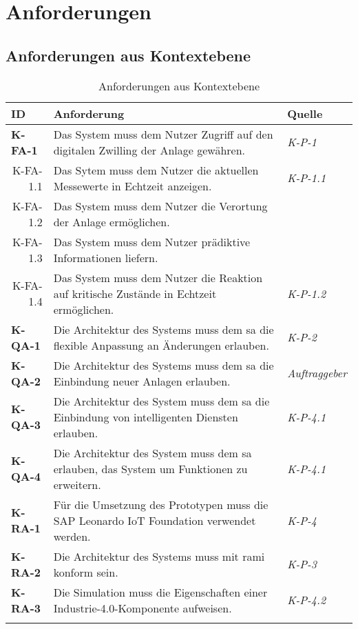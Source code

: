 \newpage
\appendix

\section{Anforderungen}

\subsection{Anforderungen aus Kontextebene} \label{anfkontext}
\begin{table}[ht!]
  \begin{tabularx}{\textwidth}{@{}lXp{2cm}@{}}
      \toprule
      ID                & Anforderung & Quelle \\
      \midrule
      \textbf{K-FA-1}              &   Das System muss dem Nutzer Zugriff auf den digitalen Zwilling der Anlage gewähren.  & \textit{K-P-1}                \\
      \multicolumn{1}{r}{K-FA-1.1} &  Das Sytem muss dem Nutzer die aktuellen Messewerte in Echtzeit anzeigen.    & \textit{K-P-1.1}\\
      \multicolumn{1}{r}{K-FA-1.2} & Das System muss dem Nutzer die Verortung der Anlage ermöglichen. \\
      \multicolumn{1}{r}{K-FA-1.3} & Das System muss dem Nutzer prädiktive Informationen liefern.\\
      \multicolumn{1}{r}{K-FA-1.4} & Das System muss dem Nutzer die Reaktion auf kritische Zustände in Echtzeit ermöglichen.  & \textit{K-P-1.2}\\
      \textbf{K-QA-1}              & Die Architektur des Systems muss dem \ac{sa} die flexible Anpassung an Änderungen erlauben.     & \textit{K-P-2}                \\
      \textbf{K-QA-2}              & Die Architektur des Systems muss dem \ac{sa} die Einbindung neuer Anlagen erlauben.           & \textit{Auftraggeber}                \\
      \textbf{K-QA-3}              &  Die Architektur des System muss dem \ac{sa} die Einbindung von intelligenten Diensten erlauben.  & \textit{K-P-4.1} \\
      \textbf{K-QA-4}              &  Die Architektur des System muss dem \ac{sa} erlauben, das System um Funktionen zu erweitern.  & \textit{K-P-4.1} \\
      \textbf{K-RA-1}              & Für die Umsetzung des Prototypen muss die SAP Leonardo IoT Foundation verwendet werden.       & \textit{K-P-4} \\
      \textbf{K-RA-2}              & Die Architektur des Systems muss mit \ac{rami} konform sein.      & \textit{K-P-3} \\
      \textbf{K-RA-3}              & Die Simulation muss die Eigenschaften einer Industrie-4.0-Komponente aufweisen.      & \textit{K-P-4.2} \\
      \addlinespace
      \bottomrule
  \end{tabularx}
  \caption{Anforderungen aus Kontextebene}
  \label{kontext_anforderungen}
\end{table}



